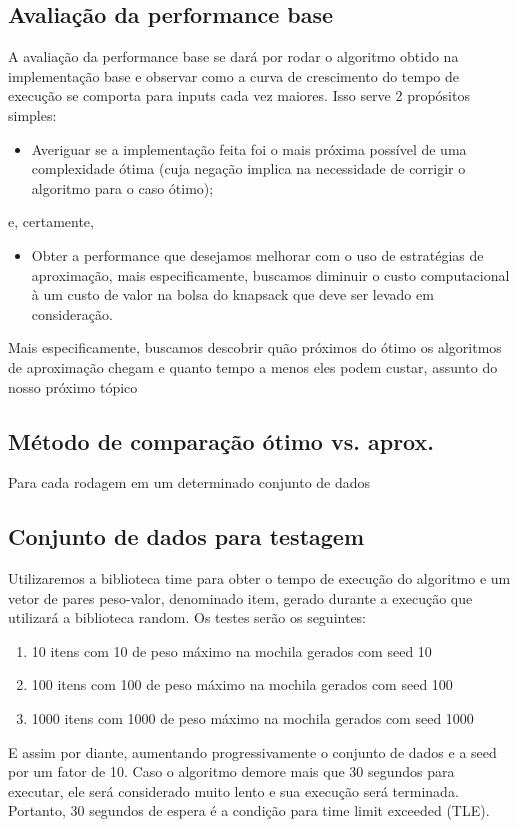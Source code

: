 \documentclass{article}
\begin{document}
\subsection{Avaliação da performance base}
A avaliação da performance base se dará por rodar o algoritmo obtido na implementação base e observar como a curva de crescimento do tempo de execução se comporta para inputs cada vez maiores. Isso serve 2 propósitos simples:
\begin{itemize}
    \item Averiguar se a implementação feita foi o mais próxima possível de uma complexidade ótima (cuja negação implica na necessidade de corrigir o algoritmo para o caso ótimo);
\end{itemize}
e, certamente,
\begin{itemize}
    \item Obter a performance que desejamos melhorar com o uso de estratégias de aproximação, mais especificamente, buscamos diminuir o custo computacional à um custo de valor na bolsa do knapsack que deve ser levado em consideração.
\end{itemize}

    Mais especificamente, buscamos descobrir quão próximos do ótimo os algoritmos de aproximação chegam e quanto tempo a menos eles podem custar, assunto do nosso próximo tópico

\subsection{Método de comparação ótimo vs. aprox.}
    Para cada rodagem em um determinado conjunto de dados
\subsection{Conjunto de dados para testagem}
Utilizaremos a biblioteca time para obter o tempo de execução do algoritmo e um vetor de pares peso-valor, denominado item, gerado durante a execução que utilizará a biblioteca random. Os testes serão os seguintes:
    \begin{enumerate}
        \item 10 itens com 10 de peso máximo na mochila gerados com seed 10
        \item 100 itens com 100 de peso máximo na mochila gerados com seed 100
        \item 1000 itens com 1000 de peso máximo na mochila gerados com seed 1000
    \end{enumerate}
E assim por diante, aumentando progressivamente o conjunto de dados e a seed por um fator de 10. Caso o algoritmo demore mais que 30 segundos para executar, ele será considerado muito lento e sua execução será terminada. Portanto, 30 segundos de espera é a condição para time limit exceeded (TLE).
\end{document}
